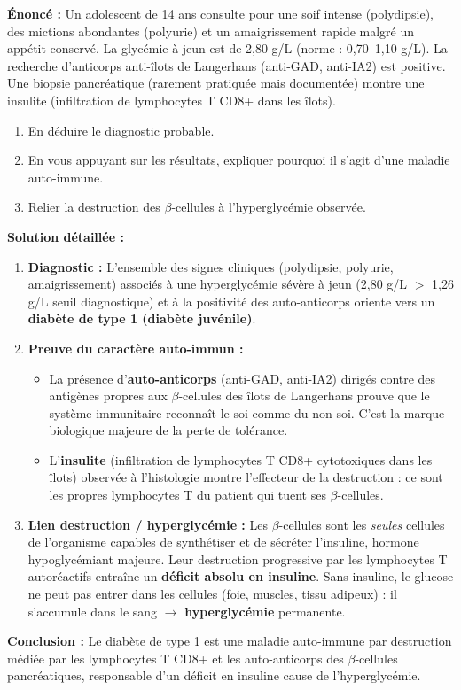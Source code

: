 \documentclass[11pt]{article}
\newcommand{\cle}[1]{{\popxbold\color{popdark}#1}}
\begin{document}
\begin{exoresolu}
\textbf{Énoncé :} Un adolescent de 14 ans consulte pour une soif intense (polydipsie), des mictions abondantes (polyurie) et un amaigrissement rapide malgré un appétit conservé. La glycémie à jeun est de 2,80 g/L (norme : 0,70--1,10 g/L). La recherche d'anticorps anti-îlots de Langerhans (anti-GAD, anti-IA2) est positive. Une biopsie pancréatique (rarement pratiquée mais documentée) montre une insulite (infiltration de lymphocytes T CD8+ dans les îlots).
\begin{enumerate}
    \item En déduire le diagnostic probable.
    \item En vous appuyant sur les résultats, expliquer pourquoi il s'agit d'une maladie auto-immune.
    \item Relier la destruction des $\beta$-cellules à l'hyperglycémie observée.
\end{enumerate}
\tcblower
\textbf{Solution détaillée :}
\begin{enumerate}
    \item \textbf{Diagnostic :} L'ensemble des signes cliniques (polydipsie, polyurie, amaigrissement) associés à une hyperglycémie sévère à jeun (2,80 g/L $>$ 1,26 g/L seuil diagnostique) et à la positivité des auto-anticorps oriente vers un \textbf{diabète de type 1 (diabète juvénile)}.
    \item \textbf{Preuve du caractère auto-immun :}
    \begin{itemize}
        \item La présence d'\textbf{auto-anticorps} (anti-GAD, anti-IA2) dirigés contre des antigènes propres aux $\beta$-cellules des îlots de Langerhans prouve que le système immunitaire reconnaît le \cle{soi} comme du \cle{non-soi}. C'est la marque biologique majeure de la perte de tolérance.
        \item L'\textbf{insulite} (infiltration de lymphocytes T CD8+ cytotoxiques dans les îlots) observée à l'histologie montre l'effecteur de la destruction : ce sont les propres lymphocytes T du patient qui tuent ses $\beta$-cellules.
    \end{itemize}
    \item \textbf{Lien destruction / hyperglycémie :} Les $\beta$-cellules sont les \emph{seules} cellules de l'organisme capables de synthétiser et de sécréter l'\cle{insuline}, hormone hypoglycémiant majeure. Leur destruction progressive par les lymphocytes T autoréactifs entraîne un \textbf{déficit absolu en insuline}. Sans insuline, le glucose ne peut pas entrer dans les cellules (foie, muscles, tissu adipeux) : il s'accumule dans le sang $\rightarrow$ \textbf{hyperglycémie} permanente.
\end{enumerate}
\textbf{Conclusion :} Le diabète de type 1 est une maladie auto-immune par destruction médiée par les lymphocytes T CD8+ et les auto-anticorps des $\beta$-cellules pancréatiques, responsable d'un déficit en insuline cause de l'hyperglycémie.
\end{exoresolu}
\end{document}
